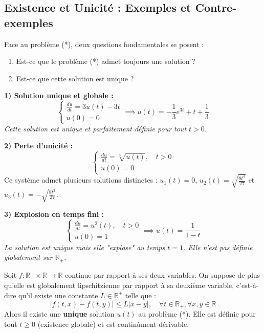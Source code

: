 \subsection{Existence et Unicité : Exemples et Contre-exemples}

Face au problème (*), deux questions fondamentales se posent :
\begin{enumerate}
    \item Est-ce que le problème (*) admet toujours une solution ?
    \item Est-ce que cette solution est unique ?
\end{enumerate}

\begin{exemple}
    \textbf{1) Solution unique et globale :}
    \[
    \begin{cases}
        \frac{du}{dt} = 3u(t) - 3t \\
        u(0) = 0
    \end{cases}
    \implies u(t) = -\frac{1}{3}e^{3t} + t + \frac{1}{3}
    \]
    \textit{Cette solution est unique et parfaitement définie pour tout $t > 0$.}

    \vspace{0.2cm}
    \textbf{2) Perte d'unicité :}
    \[
    \begin{cases}
        \frac{du}{dt} = \sqrt[3]{u(t)}, \quad t > 0 \\
        u(0) = 0
    \end{cases}
    \]
    Ce système admet plusieurs solutions distinctes : $u_1(t) = 0$, $u_2(t) = \sqrt{\frac{8t^3}{27}}$ et $u_3(t) = -\sqrt{\frac{8t^3}{27}}$.

    \vspace{0.2cm}
    \textbf{3) Explosion en temps fini :}
    \[
    \begin{cases}
        \frac{du}{dt} = u^2(t), \quad t > 0 \\
        u(0) = 1
    \end{cases}
    \implies u(t) = \frac{1}{1-t}
    \]
    \textit{La solution est unique mais elle "explose" au temps $t=1$. Elle n'est pas définie globalement sur $\mathbb{R}_+$.}
\end{exemple}

\begin{theoreme}
    Soit $f : \mathbb{R}_+ \times \mathbb{R} \rightarrow \mathbb{R}$ continue par rapport à ses deux variables. On suppose de plus qu'elle est globalement lipschitzienne par rapport à sa deuxième variable, c'est-à-dire qu'il existe une constante $L \in \mathbb{R}^+$ telle que :
    \[
    |f(t,x) - f(t,y)| \leq L |x-y|, \quad \forall t \in \mathbb{R}_+, \forall x,y \in \mathbb{R}
    \]
    Alors il existe une \textbf{unique} solution $u(t)$ au problème (*). Elle est définie pour tout $t \geq 0$ (existence globale) et est continûment dérivable.
\end{theoreme}

